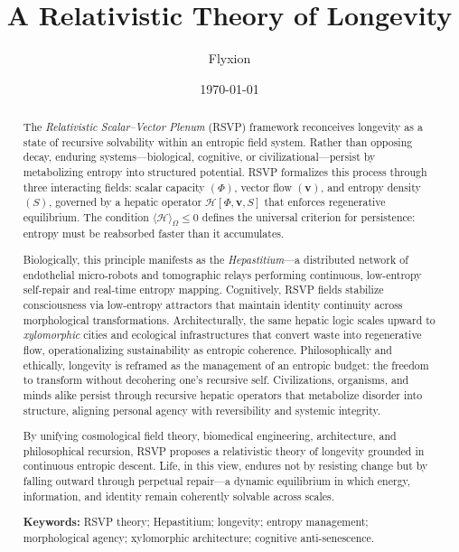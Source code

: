 \documentclass[12pt]{article}
\title{A Relativistic Theory of Longevity}
\author{Flyxion}
\date{\today}
\begin{document}
\maketitle

\begin{abstract}
The \textit{Relativistic Scalar--Vector Plenum} (RSVP) framework reconceives longevity as a state of recursive solvability within an entropic field system.  
Rather than opposing decay, enduring systems---biological, cognitive, or civilizational---persist by metabolizing entropy into structured potential.  
RSVP formalizes this process through three interacting fields: scalar capacity \((\Phi)\), vector flow \((\mathbf{v})\), and entropy density \((S)\), governed by a hepatic operator 
\(\mathcal{H}[\Phi,\mathbf{v},S]\) that enforces regenerative equilibrium.  
The condition \(\langle \mathcal{H} \rangle_\Omega \le 0\) defines the universal criterion for persistence: entropy must be reabsorbed faster than it accumulates.

Biologically, this principle manifests as the \textit{Hepastitium}---a distributed network of endothelial micro-robots and tomographic relays performing continuous, low-entropy self-repair and real-time entropy mapping.  
Cognitively, RSVP fields stabilize consciousness via low-entropy attractors that maintain identity continuity across morphological transformations.  
Architecturally, the same hepatic logic scales upward to \textit{xylomorphic} cities and ecological infrastructures that convert waste into regenerative flow, operationalizing sustainability as entropic coherence.  
Philosophically and ethically, longevity is reframed as the management of an entropic budget: the freedom to transform without decohering one’s recursive self.  
Civilizations, organisms, and minds alike persist through recursive hepatic operators that metabolize disorder into structure, aligning personal agency with reversibility and systemic integrity.

By unifying cosmological field theory, biomedical engineering, architecture, and philosophical recursion, RSVP proposes a relativistic theory of longevity grounded in continuous entropic descent.  
Life, in this view, endures not by resisting change but by falling outward through perpetual repair---a dynamic equilibrium in which energy, information, and identity remain coherently solvable across scales.

\textbf{Keywords:} RSVP theory; Hepastitium; longevity; entropy management; morphological agency; xylomorphic architecture; cognitive anti-senescence.
\end{abstract}
\end{document}
